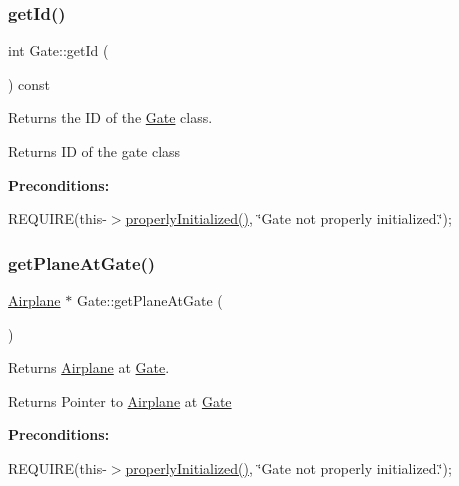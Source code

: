 \subsubsection{\texorpdfstring{get\+Id()}{getId()}}
{\footnotesize\ttfamily int Gate\+::get\+Id (\begin{DoxyParamCaption}{ }\end{DoxyParamCaption}) const}



Returns the ID of the \mbox{\hyperlink{class_gate}{Gate}} class. 

\begin{DoxyReturn}{Returns}
ID of the gate class
\end{DoxyReturn}
{\bfseries Preconditions\+:}
\begin{DoxyItemize}
\item R\+E\+Q\+U\+I\+RE(this-\/$>$\mbox{\hyperlink{class_gate_a51a6794e1e26f03c75f469a6ee8d3432}{properly\+Initialized()}}, \char`\"{}\+Gate not properly initialized.\char`\"{}); 
\end{DoxyItemize}\mbox{\label{class_gate_ac27d4ca81274494a61abe0419428a204}} 
\subsubsection{\texorpdfstring{get\+Plane\+At\+Gate()}{getPlaneAtGate()}}
{\footnotesize\ttfamily \mbox{\hyperlink{class_airplane}{Airplane}} $\ast$ Gate\+::get\+Plane\+At\+Gate (\begin{DoxyParamCaption}{ }\end{DoxyParamCaption})}



Returns \mbox{\hyperlink{class_airplane}{Airplane}} at \mbox{\hyperlink{class_gate}{Gate}}. 

\begin{DoxyReturn}{Returns}
Pointer to \mbox{\hyperlink{class_airplane}{Airplane}} at \mbox{\hyperlink{class_gate}{Gate}}
\end{DoxyReturn}
{\bfseries Preconditions\+:}
\begin{DoxyItemize}
\item R\+E\+Q\+U\+I\+RE(this-\/$>$\mbox{\hyperlink{class_gate_a51a6794e1e26f03c75f469a6ee8d3432}{properly\+Initialized()}}, \char`\"{}\+Gate not properly initialized.\char`\"{}); 
\end{DoxyItemize}\mbox{\label{class_gate_a51a6794e1e26f03c75f469a6ee8d3432}} 
